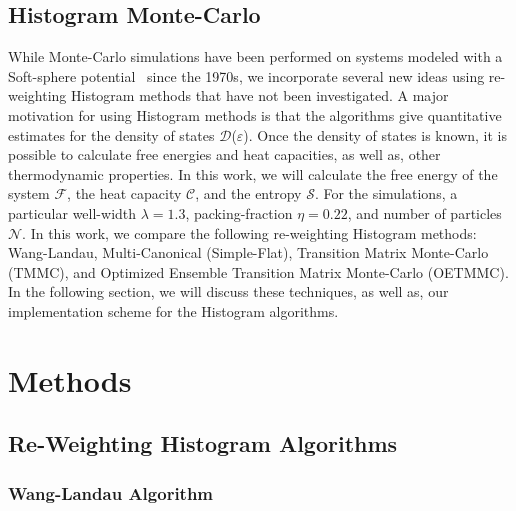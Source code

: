 \documentclass[letterpaper,twocolumn,amsmath,amssymb,pre,aps,10pt]{revtex4-1}
\begin{document}
\subsection{Histogram Monte-Carlo}

While Monte-Carlo simulations have been performed on systems modeled with a Soft-sphere potential~\cite{andersen1971relationship, hansen1970phase, sun2013efficient, ghoufi2016computer} since the 1970s, we incorporate several new ideas using re-weighting Histogram methods that have not been investigated.  A major motivation for using Histogram methods is that the algorithms give quantitative estimates for the density of states $\mathcal{D}$($\varepsilon$).  Once the density of states is known, it is possible to calculate free energies and heat capacities, as well as, other thermodynamic properties.  In this work, we will calculate the free energy of the system $\mathcal{F}$, the heat capacity $\mathcal{C}$, and the entropy $\mathcal{S}$.  For the simulations, a particular well-width $\lambda=1.3$, packing-fraction $\eta=0.22$, and number of particles $\mathcal{N}$.  In this work, we compare the following re-weighting Histogram methods:  Wang-Landau, Multi-Canonical (Simple-Flat), Transition Matrix Monte-Carlo (TMMC), and Optimized Ensemble Transition Matrix Monte-Carlo (OETMMC).  In the following section, we will discuss these techniques, as well as, our implementation scheme for the Histogram algorithms.

\section{Methods}

\subsection{Re-Weighting Histogram Algorithms}

\subsubsection{Wang-Landau Algorithm}
\end{document}
